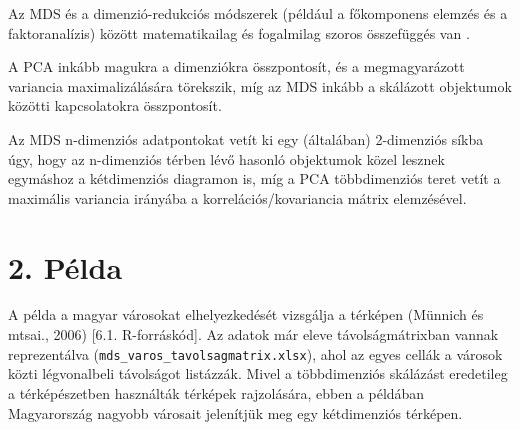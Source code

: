 \documentclass[
  letterpaper,
]{krantz}
\begin{document}
Az MDS és a dimenzió-redukciós módszerek (például a főkomponens elemzés
és a faktoranalízis) között matematikailag és fogalmilag szoros
összefüggés van .

A PCA inkább magukra a dimenziókra összpontosít, és a megmagyarázott
variancia maximalizálására törekszik, míg az MDS inkább a skálázott
objektumok közötti kapcsolatokra összpontosít.

Az MDS n-dimenziós adatpontokat vetít ki egy (általában) 2-dimenziós
síkba úgy, hogy az n-dimenziós térben lévő hasonló objektumok közel
lesznek egymáshoz a kétdimenziós diagramon is, míg a PCA többdimenziós
teret vetít a maximális variancia irányába a korrelációs/kovariancia
mátrix elemzésével.

\hypertarget{puxe9lda-1}{%
\section{2. Példa}\label{puxe9lda-1}}

A példa a magyar városokat elhelyezkedését vizsgálja a térképen (Münnich
és mtsai., 2006) {[}6.1. R-forráskód{]}. Az adatok már eleve
távolságmátrixban vannak reprezentálva
(\texttt{mds\_varos\_tavolsagmatrix.xlsx}), ahol az egyes cellák a
városok közti légvonalbeli távolságot listázzák. Mivel a többdimenziós
skálázást eredetileg a térképészetben használták térképek rajzolására,
ebben a példában Magyarország nagyobb városait jelenítjük meg egy
kétdimenziós térképen.
\end{document}
